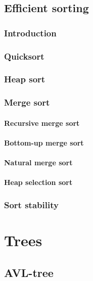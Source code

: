 \documentclass[oneside]{book}
\begin{document}
\section{Efficient sorting}

\subsection{Introduction}

\subsection{Quicksort}

\subsection{Heap sort}

\subsection{Merge sort}

\subsubsection{Recursive merge sort}

\subsubsection{Bottom-up merge sort}

\subsubsection{Natural merge sort}

\subsubsection{Heap selection sort}

\subsection{Sort stability}

\chapter{Trees} 

\section{AVL-tree}
\end{document}
